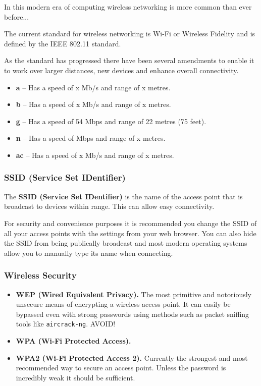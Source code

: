 \documentclass{article}
\begin{document}
In this modern era of computing wireless networking is more common than ever before...

The current standard for wireless networking is Wi-Fi or Wireless Fidelity and is defined by the IEEE 802.11 standard.

As the standard has progressed there have been several amendments to enable it to work over larger distances, new devices and enhance overall connectivity.

\begin{itemize}
    \item \textbf{a} -- Has a speed of x Mb/s and range of x metres.
    \item \textbf{b} -- Has a speed of x Mb/s and range of x metres.
    \item \textbf{g} -- Has a speed of 54 Mbps and range of 22 metres (75 feet).
    \item \textbf{n} -- Has a speed of Mbps and range of x metres.
    \item \textbf{ac} -- Has a speed of x Mb/s and range of x metres.
\end{itemize}



\subsubsection{SSID (Service Set IDentifier)}

The \textbf{SSID (Service Set IDentifier)} is the name of the access point that is broadcast to devices within range. This can allow easy connectivity.

For security and convenience purposes it is recommended you change the SSID of all your access points with the settings from your web browser. You can also hide the SSID from being publically broadcast and most modern operating systems allow you to manually type its name when connecting.

\subsubsection{Wireless Security}

\begin{itemize}
    \item \textbf{WEP (Wired Equivalent Privacy).} The most primitive and notoriously unsecure means of encrypting a wireless access point. It can easily be bypassed even with strong passwords using methods such as packet sniffing tools like \texttt{aircrack-ng}. AVOID!
    \item \textbf{WPA (Wi-Fi Protected Access).}
    \item \textbf{WPA2 (Wi-Fi Protected Access 2).} Currently the strongest and most recommended way to secure an access point. Unless the password is incredibly weak it should be sufficient.
\end{itemize}
\end{document}
